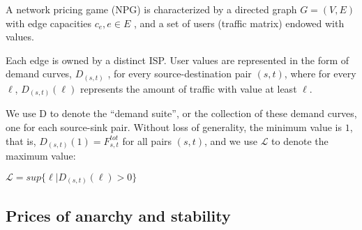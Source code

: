 \documentclass{beamer}
\begin{document}
\begin{frame}
A network pricing game (NPG) is characterized by a directed graph $G = (V, E)$
with edge capacities ${c_e}, e \in E$ , and a set of users (traffic matrix) endowed with
values.

Each edge is owned by a distinct ISP.
User values are represented in the form of demand curves, $D_{(s,t)}$ ,
for every source-destination pair $(s, t)$, where for every $\ell$, $D_{(s,t)} (\ell)$ represents the
amount of traffic with value at least $\ell$.
\end{frame}

\begin{frame}
We use D to denote the “demand suite”, or the collection of these demand curves, one for each source-sink pair.
Without loss of generality, the minimum value is $1$, that is, $D_{(s,t)} (1) = F^{tot}_{s,t}$ for all pairs $(s, t)$,
and we use $\mathcal{L}$ to denote the maximum value:
\begin{center}
$\mathcal{L} = sup\{\ell|D_{(s,t)} (\ell) > 0\}$
\end{center}
\end{frame}



\subsection{Prices of anarchy and stability}
\end{document}
